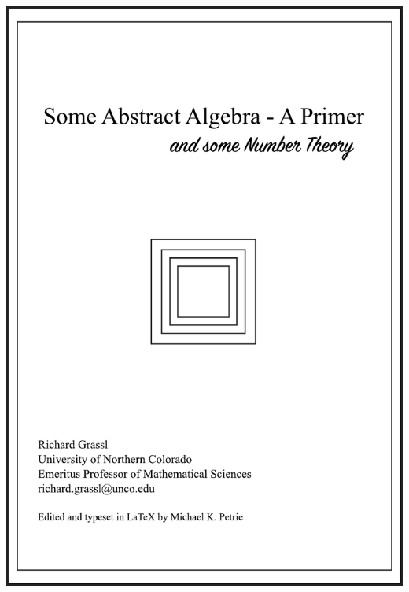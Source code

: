 \documentclass[12pt]{article}
\theoremstyle{definition}
\begin{document}
\pagestyle{empty}
\centerline{\includegraphics[width=6in]{Coverpage.pdf}}
\newpage
\pagestyle{plain}
\rule{0in}{1in}\\
\end{document}
